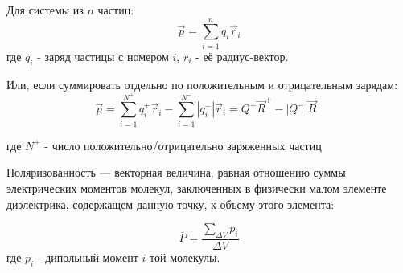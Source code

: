 Для системы из $n$ частиц:
$$
\vec p=\sum_{i=1}^nq_i\vec r_i
$$
где $q_i$ - заряд частицы с номером $i$,
$r_i$ - её радиус-вектор.

Или, если суммировать отдельно по положительным и отрицательным зарядам:
$$
\vec p=\sum_{i=1}^{N^+}q_i^+\vec r_i-\sum_{i=1}^{N^-}|q_i^-|\vec r_i=Q^+\vec R^+-|Q^-|\vec R^-
$$

где $N^\pm$ - число положительно/отрицательно заряженных частиц

\begin{definition}
    Поляризованность — векторная величина, равная отношению суммы электрических моментов молекул, заключенных в физически малом элементе 
    диэлектрика, содержащем данную точку, к объему этого элемента:

    $$
    \overline P=\frac{\sum_{\Delta V}\overline p_i}{\Delta V}
    $$
    где $\overline p_i$ - дипольный момент $i$-той молекулы.
\end{definition}
